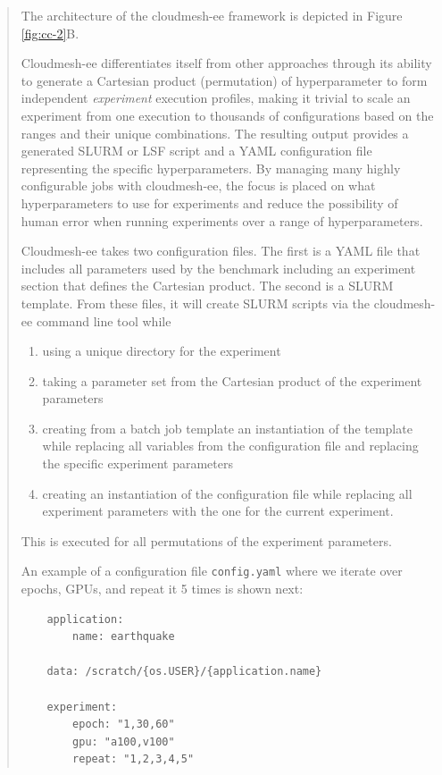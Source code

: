 \documentclass[utf8]{FrontiersinVancouver} %
\begin{document}
\begin{quote}
The architecture of the cloudmesh-ee framework is depicted in Figure \ref{fig:cc-2}B.

Cloudmesh-ee differentiates itself from other approaches through its ability to generate a Cartesian product (permutation) of hyperparameter to form independent {\it experiment} execution profiles, making it trivial to scale an experiment from one execution to thousands of configurations based on the ranges and their unique combinations.  The resulting output provides a generated SLURM or LSF script and a YAML configuration file representing the specific hyperparameters.  By managing many highly configurable jobs with cloudmesh-ee, the focus is placed on what hyperparameters to use for experiments and reduce the possibility of human error when running experiments over a range of hyperparameters.

Cloudmesh-ee takes two configuration files. The first is a YAML file that includes all parameters used by the benchmark including an experiment section that defines the Cartesian product. The second is a SLURM template. From these files, it will create SLURM scripts via the cloudmesh-ee command line tool while

\begin{enumerate}
  \item using a unique directory for the experiment
  \item taking a parameter set from the Cartesian product of the experiment parameters
  \item creating from a batch job template an instantiation of the template while replacing all variables from the configuration file    and replacing the specific experiment parameters
  \item creating an instantiation of the configuration file while replacing all experiment parameters with the one for the current experiment.
\end{enumerate}

This is executed for all permutations of the experiment parameters.

An example of a configuration file \verb|config.yaml| where we iterate over epochs, GPUs, and repeat it 5 times is shown next:

\begin{lstlisting}
    application:
        name: earthquake

    data: /scratch/{os.USER}/{application.name}
       
    experiment:
        epoch: "1,30,60"
        gpu: "a100,v100"
        repeat: "1,2,3,4,5"
\end{lstlisting}


\end{quote}
\end{document}
